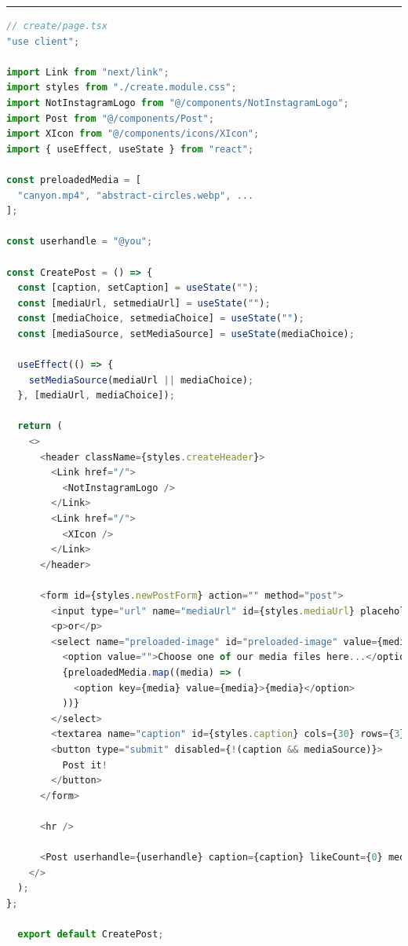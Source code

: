 \documentclass[a4paper, 12pt]{article}
\begin{document}
\vspace{0.5cm} \hrule \vspace{0.5cm}

\begin{lstlisting}[caption=Create page in Next.js, label={lst:Next:Create}, language=JavaScript]
// create/page.tsx
"use client";

import Link from "next/link";
import styles from "./create.module.css";
import NotInstagramLogo from "@/components/NotInstagramLogo";
import Post from "@/components/Post";
import XIcon from "@/components/icons/XIcon";
import { useEffect, useState } from "react";
  
const preloadedMedia = [
  "canyon.mp4", "abstract-circles.webp", ...
];
  
const userhandle = "@you";

const CreatePost = () => {
  const [caption, setCaption] = useState("");
  const [mediaUrl, setmediaUrl] = useState("");
  const [mediaChoice, setmediaChoice] = useState("");
  const [mediaSource, setMediaSource] = useState(mediaChoice);

  useEffect(() => {
    setMediaSource(mediaUrl || mediaChoice);
  }, [mediaUrl, mediaChoice]);
    
  return (
    <>
      <header className={styles.createHeader}>
        <Link href="/">
          <NotInstagramLogo />
        </Link>
        <Link href="/">
          <XIcon />
        </Link>
      </header>
    
      <form id={styles.newPostForm} action="" method="post">
        <input type="url" name="mediaUrl" id={styles.mediaUrl} placeholder="Insert your media URL here..." value={mediaUrl} onChange={(event) => setmediaUrl(event.target.value)} />
        <p>or</p>
        <select name="preloaded-image" id="preloaded-image" value={mediaChoice} onChange={(event) => setmediaChoice(event.target.value)} >
          <option value="">Choose one of our media files here...</option>
          {preloadedMedia.map((media) => (
            <option key={media} value={media}>{media}</option>
          ))}
        </select>
        <textarea name="caption" id={styles.caption} cols={30} rows={3} placeholder="Type your caption here" value={caption} onChange={(event) => setCaption(event.target.value)} />
        <button type="submit" disabled={!(caption && mediaSource)}>
          Post it!
        </button>
      </form>
    
      <hr />
    
      <Post userhandle={userhandle} caption={caption} likeCount={0} mediaSource={mediaSource} hideActionIcons={true} />
    </>
  );
};
  
  export default CreatePost;
  
\end{lstlisting}
\end{document}
